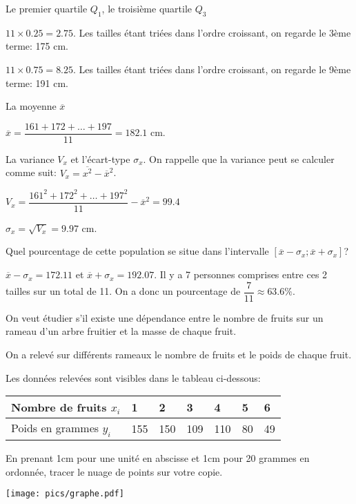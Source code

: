 \documentclass[a4paper,12pt]{scrartcl}
\begin{document}
\question{}
Le premier quartile $Q_1$, le troisième quartile $Q_3$

$11 \times 0.25 = 2.75$. Les tailles étant triées dans l'ordre croissant, on regarde le 3ème terme: 175 cm.

$11 \times 0.75 = 8.25$. Les tailles étant triées dans l'ordre croissant, on regarde le 9ème terme: 191 cm.

\question{}
La moyenne $\overline{x}$

$\overline{x} = \dfrac{161+172+\ldots+197}{11} = 182.1$ cm.

\question{}
La variance $V_x$ et l'écart-type $\sigma_x$. On rappelle que la variance peut se calculer comme suit: $V_x = \overline{x^2} - \overline{x}^2$.

$V_x = \dfrac{161^2+172^2+\ldots+197^2}{11} - \overline{x}^2 = 99.4$

$\sigma_x = \sqrt{V_x} = 9.97$ cm.

\question{}
Quel pourcentage de cette population se situe dans l'intervalle $[\overline{x} - \sigma_x ; \overline{x} + \sigma_x]$?

$\overline{x} - \sigma_x = 172.11$ et $\overline{x} + \sigma_x = 192.07$. Il y a 7 personnes comprises entre ces 2 tailles sur un total de 11. On a donc un pourcentage de $\dfrac{7}{11} \approx 63.6 \%$.


On veut étudier s'il existe une dépendance entre le nombre de fruits sur un rameau d'un arbre fruitier et la masse de chaque fruit. 

On a relevé sur différents rameaux le nombre de fruits et le poids de chaque fruit. 

Les données relevées sont visibles dans le tableau ci-dessous:

\begin{center}
\begin{tabular}{|l|l|l|l|l|l|l|}
\hline
Nombre de fruits $x_i$       & 1   & 2   & 3   & 4   & 5  & 6  \\ \hline
Poids en grammes $y_i$ & 155 & 150 & 109 & 110 & 80 & 49 \\ \hline
\end{tabular}
\end{center}

\question{}
En prenant 1cm pour une unité en abscisse et 1cm pour 20 grammes en ordonnée, tracer le nuage de points sur votre copie.

\begin{center}
\texttt{[image: pics/graphe.pdf]}
\end{center}
\end{document}

